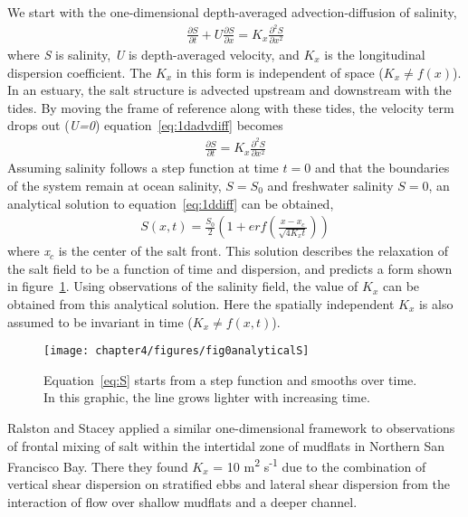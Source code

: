We start with the one-dimensional depth-averaged advection-diffusion of salinity,
\begin{eqnarray}
\frac{\partial S}{\partial t} + U\frac{\partial S}{\partial x} = K_x\frac{\partial^2S}{\partial x^2} \label{eq:1dadvdiff}
\end{eqnarray}
where \emph{S} is salinity, \emph{U} is depth-averaged velocity, and $K_x$ is the longitudinal dispersion coefficient. The $K_x$ in this form is independent of space ($K_x\ne f(x)$).  In an estuary, the salt structure is advected upstream and downstream with the tides. By moving the frame of reference along with these tides, the velocity term drops out (\emph{U=0}) equation~\ref{eq:1dadvdiff} becomes
\begin{eqnarray}
\frac{\partial S}{\partial t} = K_x\frac{\partial^2S}{\partial x^2} \label{eq:1ddiff}
\end{eqnarray}
Assuming salinity follows a step function at time $t=0$ and that the boundaries of the system remain at ocean salinity, $S=S_0$ and freshwater salinity $S=0$, an analytical solution to equation~\ref{eq:1ddiff} can be obtained,
\begin{eqnarray}
S(x,t) = \frac{S_0}{2}\left(1+erf\left(\frac{x-x_c}{\sqrt{4K_xt}}\right)\right) \label{eq:S}
\end{eqnarray}
where \emph{x$_c$} is the center of the salt front. This solution describes the relaxation of the salt field to be a function of time and dispersion, and predicts a form shown in figure~\ref{fig:Sgraphic}. Using observations of the salinity field, the value of $K_x$ can be obtained from this analytical solution. Here the spatially independent $K_x$ is also assumed to be invariant in time ($K_x\ne f(x,t)$). 

\begin{figure}[h!]
\texttt{[image: chapter4/figures/fig0analyticalS]}
\caption{Equation~\ref{eq:S} starts from a step function and smooths over time. In this graphic, the line grows lighter with increasing time.} \label{fig:Sgraphic}
\end{figure}

Ralston and Stacey  \parencite*{Ralston:2005aa} applied a similar one-dimensional framework to observations of frontal mixing of salt within the intertidal zone of mudflats in Northern San Francisco Bay. There they found $K_x$ = 10 m\textsuperscript{2} s\textsuperscript{-1} due to the combination of vertical shear dispersion on stratified ebbs and lateral shear dispersion from the interaction of flow over shallow mudflats and a deeper channel. 

